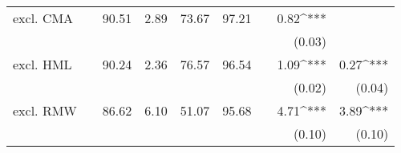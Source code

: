 \begin{table}
\begin{tabularx}{\textwidth}{@{} l X dddd X dd @{}}
    excl. CMA && 90.51 & 2.89 & 73.67 & 97.21 &&  0.82^{***}  &             \\
              &&        &       &        &    && (0.03)       &             \\
    excl. HML && 90.24 & 2.36 & 76.57 & 96.54 &&  1.09^{***}  &  0.27^{***}  \\
              &&        &       &        &    && (0.02)       & (0.04)     \\
    excl. RMW && 86.62 & 6.10 & 51.07 & 95.68 &&  4.71^{***}  & 3.89^{***}      \\
              &&        &       &        &    &&  (0.10)      & (0.10)     \\
    \bottomrule
  \end{tabularx}

  \label{tab:cdb_table}
\end{table}
